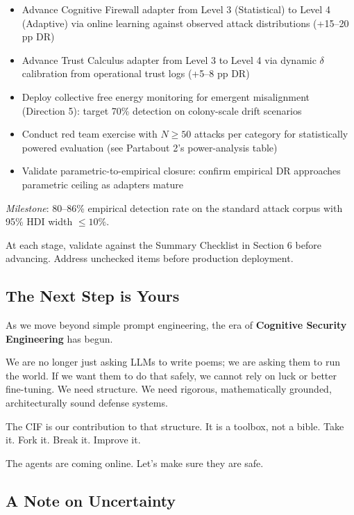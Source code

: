 \documentclass[
]{article}
\providecommand{\tightlist}{%
  \setlength{\itemsep}{0pt}\setlength{\parskip}{0pt}}
\begin{document}
\begin{itemize}
\tightlist
\item
  Advance Cognitive Firewall adapter from Level 3 (Statistical) to Level
  4 (Adaptive) via online learning against observed attack distributions
  (+15--20 pp DR)
\item
  Advance Trust Calculus adapter from Level 3 to Level 4 via dynamic \texorpdfstring{\ensuremath{\delta}}{delta}
  calibration from operational trust logs (+5--8 pp DR)
\item
  Deploy collective free energy monitoring for emergent misalignment
  (Direction 5): target 70\% detection on colony-scale drift scenarios
\item
  Conduct red team exercise with \(N \geq 50\) attacks per category for
  statistically powered evaluation (see Partabout 2's
  power-analysis table)
\item
  Validate parametric-to-empirical closure: confirm empirical DR
  approaches parametric ceiling as adapters mature
\end{itemize}

\emph{Milestone}: 80--86\% empirical detection rate on the standard
attack corpus with 95\% HDI width \(\leq 10\%\).

At each stage, validate against the Summary Checklist in Section 6
before advancing. Address unchecked items before production deployment.

\subsection{The Next Step is Yours}\label{the-next-step-is-yours}

As we move beyond simple prompt engineering, the era of
\textbf{Cognitive Security Engineering} has begun.

We are no longer just asking LLMs to write poems; we are asking them to
run the world. If we want them to do that safely, we cannot rely on luck
or better fine-tuning. We need structure. We need rigorous,
mathematically grounded, architecturally sound defense systems.

The CIF is our contribution to that structure. It is a toolbox, not a
bible. Take it. Fork it. Break it. Improve it.

The agents are coming online. Let's make sure they are safe.

\subsection{A Note on Uncertainty}\label{sec:uncertainty-note}
\end{document}
